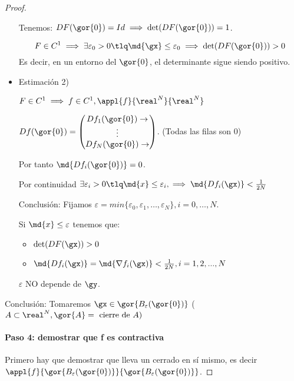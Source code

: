 \documentclass{apuntes}
\begin{document}
\begin{proof}
\begin{itemize}
  Tenemos: $DF(\gor{0}) = Id \implies \det(DF(\gor{0})) = 1$. 
  
  $$F\in C^1 \implies \exists \varepsilon_0 >0 \tlq \md{\gx} \leq \varepsilon_0 \implies  \det(DF(\gor{0}))>0$$
  Es decir, en un entorno del $\gor{0}$, el determinante sigue siendo positivo.
  
  \item Estimación 2)
  
  $F\in C^1 \implies f \in C^1, \appl{f}{\real^N}{\real^N}$
  
  $Df(\gor{0}) = \begin{pmatrix}
                  Df_1(\gor{0}) \rightarrow\\
                  \vdots\\
                  Df_N(\gor{0}) \rightarrow
                 \end{pmatrix}$. (Todas las filas son 0)
                 
 Por tanto $\md{Df_i(\gor{0})} = 0$.
 
 Por continuidad $\exists \varepsilon_i > 0 \tlq \md{x} \leq \varepsilon_i, \implies \md{Df_i(\gx)} <\frac{1}{2N}$
 
 Conclusión: Fijamos $\varepsilon = min \{\varepsilon_0,\varepsilon_1,\dotsc, \varepsilon_N\} ,i=0,\dotsc,N$.
 
 Si $\md{x} \leq \varepsilon$ tenemos que: \begin{itemize}
                                             \item $\det(DF(\gx))>0$
                                             \item $\md{Df_i(\gx)}  = \md{\nabla f_i(\gx)} < \frac{1}{2N}, i=1,2,...,N$
                                            \end{itemize}
                                            
 \obs $\varepsilon$ NO depende de $\gy$.

 
 \end{itemize}
  Conclusión: Tomaremos $\gx\in \gor{B_\varepsilon(\gor{0})}$ ($A\subset\real^N, \gor{A} = \text{ cierre de } A)$
  
  \paragraph{Paso 4: demostrar que f es contractiva }
  
  Primero hay que demostrar que lleva un cerrado en sí mismo, es decir $\appl{f}{ \gor{B_\varepsilon(\gor{0})}}{ \gor{B_\varepsilon(\gor{0})}}$.
  

\end{proof}
\end{document}

